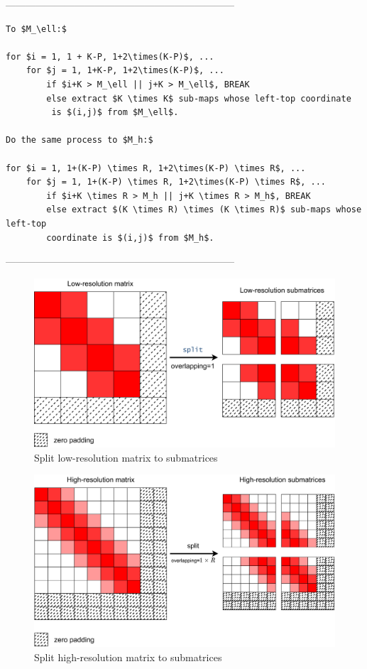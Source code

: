 \documentclass{article}
\begin{document}
---------------------------------------------------------------------
\begin{Verbatim}[commandchars=\\\{\},codes={\catcode`$=3\catcode`_=8\catcode`^=7}]
% Divide matrices $M_\ell$ and $M_h$ \
To $M_\ell:$

for $i = 1, 1 + K-P, 1+2\times(K-P)$, ... 
    for $j = 1, 1+K-P, 1+2\times(K-P)$, ...
        if $i+K > M_\ell || j+K > M_\ell$, BREAK 
        else extract $K \times K$ sub-maps whose left-top coordinate
         is $(i,j)$ from $M_\ell$.

Do the same process to $M_h:$

for $i = 1, 1+(K-P) \times R, 1+2\times(K-P) \times R$, ...
    for $j = 1, 1+(K-P) \times R, 1+2\times(K-P) \times R$, ...
        if $i+K \times R > M_h || j+K \times R > M_h$, BREAK 
        else extract $(K \times R) \times (K \times R)$ sub-maps whose left-top 
        coordinate is $(i,j)$ from $M_h$.
\end{Verbatim}
---------------------------------------------------------------------
\begin{figure}[htbp]
\centering
\includegraphics[scale=0.03]{figures/lowres_split.png}
\caption{Split low-resolution matrix to submatrices}
\end{figure}

\begin{figure}[htbp]
    \centering
    \includegraphics[scale=0.03]{figures/highres_split.png}
    \caption{Split high-resolution matrix to submatrices}
    \end{figure}
\end{document}
